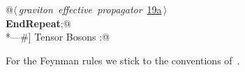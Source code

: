 \documentclass[a4paper,12pt]{amsart}
\renewcommand{\NWlink}[2]{\hyperlink{#1}{#2}}
\renewcommand{\NWsep}{${\diamond}$}
\begin{document}
\begin{flushleft}
\begin{list}{}{}
\mbox{}\verb@   @\hbox{$\langle\,${\itshape graviton effective propagator}\nobreak\ {\footnotesize \NWlink{nuweb19a}{19a}}$\,\rangle$}\verb@@\\
\mbox{}\verb@@\hbox{\sffamily\bfseries EndRepeat}\verb@;@\\
\mbox{}\verb@*---#] Tensor Bosons :@\\
\mbox{}\verb@@{\NWsep}
\end{list}
\vspace{-1.5ex}
\footnotesize
\begin{list}{}{\setlength{\itemsep}{-\parsep}\setlength{\itemindent}{-\leftmargin}}

\item{}
\end{list}
\vspace{4ex}
\end{flushleft}
For the Feynman rules we stick to the conventions of~\cite{1}.
\end{document}
